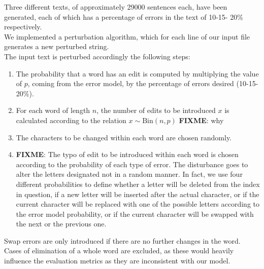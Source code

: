 Three different texts, of approximately \num{29000} sentences each, have been generated, each of which has a 
percentage of errors in the text of \num{10}-\num{15}-
\num{20}\% respectively. \\

We implemented a perturbation algorithm, which for each line of our input file generates a new perturbed string.\\
The input text is perturbed accordingly the following steps:

\begin{enumerate}
	\item The probability that a word has an edit is computed by multiplying the value of $p$, coming from the error model, 
	by the percentage of errors desired (10-15-20\%).
	\item For each word of length $n$, the number of edits to be introduced $x$ is calculated according to the relation $x 
	\sim \text{Bin}(n, p)$ \textbf{FIXME}: why
	\item The characters to be changed within each word are chosen randomly.
	\item \textbf{FIXME}:  The typo of edit to be introduced within each word is chosen according to the probability of each 
	type of error.
	The disturbance goes to alter the letters designated not in a random manner. 
	In fact, we use four different probabilities to define whether a letter will be deleted from the index in question, if a new 
	letter will be inserted after the actual character, or if the current character will be replaced with one of the possible 
	letters according to the error model probability, or if the current character will be swapped with the next or the previous 
	one.
	
\end{enumerate}

Swap errors are only introduced if there are no further changes in the word. Cases of elimination of a whole word are 
excluded, as these would heavily influence the evaluation metrics as they are 
inconsistent with our model. 




